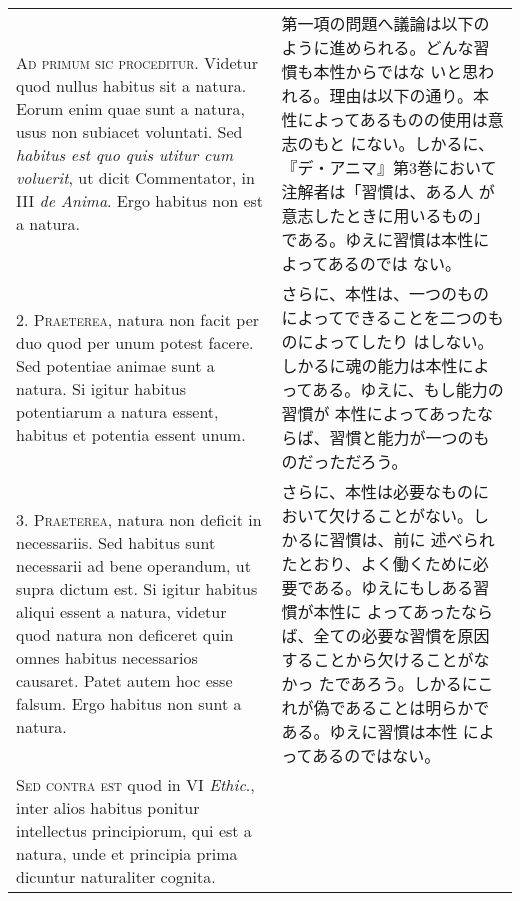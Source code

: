 \documentclass[10pt]{jsarticle} %
\begin{document}
\begin{longtable}{p{21em}p{21em}}


{\scshape Ad primum sic proceditur}. Videtur quod nullus habitus sit a
natura. Eorum enim quae sunt a natura, usus non subiacet
voluntati. Sed {\itshape habitus est quo quis utitur cum voluerit}, ut
dicit Commentator, in III {\itshape de Anima}. Ergo habitus non est a
natura.

&

第一項の問題へ議論は以下のように進められる。どんな習慣も本性からではな
いと思われる。理由は以下の通り。本性によってあるものの使用は意志のもと
にない。しかるに、『デ・アニマ』第3巻において注解者は「習慣は、ある人
が意志したときに用いるもの」である。ゆえに習慣は本性によってあるのでは
ない。

\\



2. {\scshape Praeterea}, natura non facit per duo quod per unum potest
facere. Sed potentiae animae sunt a natura. Si igitur habitus
potentiarum a natura essent, habitus et potentia essent unum.


&

さらに、本性は、一つのものによってできることを二つのものによってしたり
はしない。しかるに魂の能力は本性によってある。ゆえに、もし能力の習慣が
本性によってあったならば、習慣と能力が一つのものだっただろう。

\\





3. {\scshape Praeterea}, natura non deficit in necessariis. Sed
habitus sunt necessarii ad bene operandum, ut supra dictum est. Si
igitur habitus aliqui essent a natura, videtur quod natura non
deficeret quin omnes habitus necessarios causaret. Patet autem hoc
esse falsum. Ergo habitus non sunt a natura.


&

さらに、本性は必要なものにおいて欠けることがない。しかるに習慣は、前に
述べられたとおり、よく働くために必要である。ゆえにもしある習慣が本性に
よってあったならば、全ての必要な習慣を原因することから欠けることがなかっ
たであろう。しかるにこれが偽であることは明らかである。ゆえに習慣は本性
によってあるのではない。

\\





{\scshape Sed contra est} quod in VI {\itshape Ethic}., inter alios
habitus ponitur intellectus principiorum, qui est a natura, unde et
principia prima dicuntur naturaliter cognita.


\end{longtable}
\end{document}
